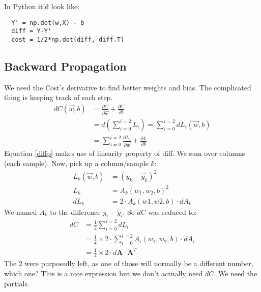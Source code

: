 In Python it'd look like:
\begin{center}
  \begin{BVerbatim}
  Y' = np.dot(w,X) - b
  diff = Y-Y' 
  cost = 1/2*np.dot(diff, diff.T)
  \end{BVerbatim}
\end{center}





\subsection{Backward Propagation}
We need the Cost's derivative to find better weights and bias. The complicated thing is keeping track of each step.
\begin{align}
  dC(\vec{w},b) &= \frac{\partial C}{\partial \vec{w}} + \frac{\partial C}{\partial b}\nonumber\\
  &= d(\sum_{i=0}^{i=2}L_i) = \sum_{i=0}^{i=2}dL_i(\vec{w},b) \label{diffp}\\
  &=\sum_{i=0}^{i=2} \frac{\partial L_i}{\partial \vec{w}} + \frac{\partial L}{\partial b}\nonumber
\end{align}
Equation \ref{diffp} makes use of linearity property of diff. We sum over columns (each sample). Now, pick up a column/sample $k$:
\begin{align*}
  L_k(\vec{w},b) &= (y_k - \hat{y_k})^2\\
    L_k &= A_k(w_1, w_2, b)^2\\
    dL_k &= 2\cdot{}A_k(w1,w2,b)\cdot{}dA_k
\end{align*}
We named $A_k$ to the difference $y_i-\hat{y}_i$.
So $dC$ was reduced to:
\begin{align}
  dC &= \frac{1}{2}\sum_{i=0}^{i=2} dL_i\\
  &= \frac{1}{2}\times{}2\cdot{}\sum_{i=0}^{i=2}A_i(w_1, w_2, b)\cdot{}dA_i\\
  &= \frac{1}{2}\times{}2\cdot{}d\mathbf{A}\cdot{}\mathbf{A}^T
\end{align}
The $2$ were purposedly left, as one of those will normally be a different number, which one? 
This is a nice expression but we don't actually need $dC$. We need the partials.


